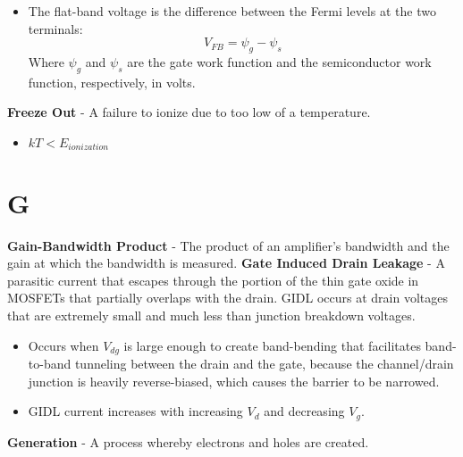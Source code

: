     \vspace{0.15cm}
    \begin{itemize}
        \setlength\itemsep{0.5em}
        \item The flat-band voltage is the difference between the Fermi levels at the two terminals:
        \begin{equation}
            V_{FB} = \psi_g - \psi_s
        \end{equation}
        Where $\psi_g$ and $\psi_s$ are the gate work function and the semiconductor work function, respectively, in volts.
    \end{itemize}
\vspace{0.5cm}
    \textbf{Freeze Out} - A failure to ionize due to too low of a temperature.
    \begin{itemize}
        \setlength\itemsep{0.5em}
        \item $kT < E_{ionization}$
    \end{itemize}
\section{G}
    \textbf{Gain-Bandwidth Product} - The product of an amplifier's bandwidth and the gain at which the bandwidth is measured.
    \vspace{0.15cm}
    \textbf{Gate Induced Drain Leakage} - A parasitic current that escapes through the portion of the thin gate oxide in MOSFETs that partially overlaps with the drain. GIDL occurs at drain voltages that are extremely small and much less than junction breakdown voltages.
    \vspace{0.15cm}
    \begin{itemize}
        \setlength\itemsep{0.5em}
        \item{Occurs when $V_{dg}$ is large enough to create band-bending that facilitates band-to-band tunneling between the drain and the gate, because the channel/drain junction is heavily reverse-biased, which causes the barrier to be narrowed.}
        \item{GIDL current increases with increasing $V_d$ and decreasing $V_g$.}
    \end{itemize}
\vspace{0.5cm}
    \textbf{Generation} - A process whereby electrons and holes are created.

